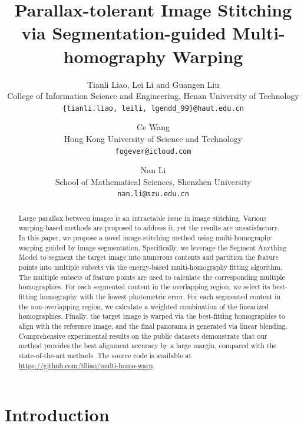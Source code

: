 \documentclass[10pt,twocolumn,letterpaper]{article}
\title{Parallax-tolerant Image Stitching via Segmentation-guided Multi-homography Warping}
\author{Tianli Liao, Lei Li and Guangen Liu\\
College of Information Science and Engineering, Henan University of Technology\\
{\tt\small \{tianli.liao, leili, lgendd\_99\}@haut.edu.cn}
\and
Ce Wang\\
Hong Kong University of Science and Technology\\
{\tt\small fogever@icloud.com}
\and
Nan Li\\
School of Mathematical Sciences, Shenzhen University\\
{\tt\small nan.li@szu.edu.cn}
}
\begin{document}
	
	
\maketitle


\begin{abstract}
	Large parallax between images is an intractable issue in image stitching. Various warping-based methods are proposed to address it, yet the results are unsatisfactory. In this paper, we propose a novel image stitching method using multi-homography warping guided by image segmentation. Specifically, we leverage the Segment Anything Model to segment the target image into numerous contents and partition the feature points into multiple subsets via the energy-based multi-homography fitting algorithm. The multiple subsets of feature points are used to calculate the corresponding multiple homographies. For each segmented content in the overlapping region, we select its best-fitting homography with the lowest photometric error. For each segmented content in the non-overlapping region, we calculate a weighted combination of the linearized homographies. Finally, the target image is warped via the best-fitting homographies to align with the reference image, and the final panorama is generated via linear blending. Comprehensive experimental results on the public datasets demonstrate that our method provides the best alignment accuracy by a large margin, compared with the state-of-the-art methods. The source code is available at \url{https://github.com/tlliao/multi-homo-warp}.
\end{abstract}


\section{Introduction}
\label{sec:intro}
\end{document}
